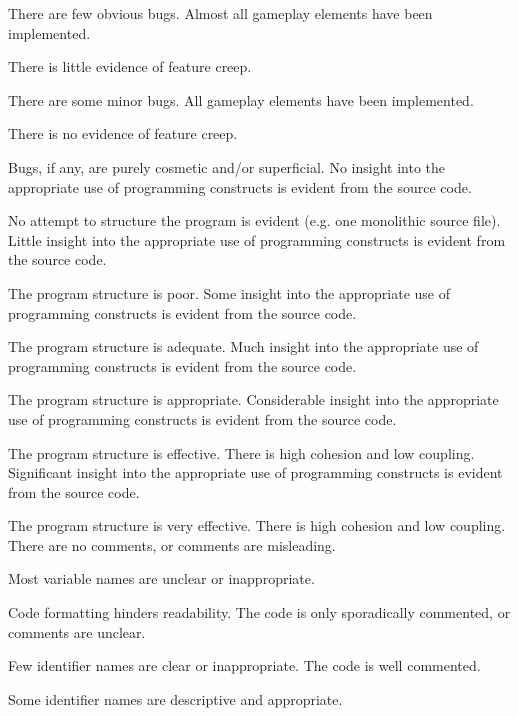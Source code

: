\documentclass{../../fal_assignment}
\begin{document}
\begin{markingrubric}
            \par There are few obvious bugs.
        \grade Almost all gameplay elements have been implemented.
            \par There is little evidence of feature creep.
            \par There are some minor bugs.
        \grade All gameplay elements have been implemented.
            \par There is no evidence of feature creep.
            \par Bugs, if any, are purely cosmetic and/or superficial.
%
        \grade\fail No insight into the appropriate use of programming constructs is evident from the source code.
            \par No attempt to structure the program is evident (e.g. one monolithic source file).
        \grade Little insight into the appropriate use of programming constructs is evident from the source code.
            \par The program structure is poor.
        \grade Some insight into the appropriate use of programming constructs is evident from the source code.
            \par The program structure is adequate.
        \grade Much insight into the appropriate use of programming constructs is evident from the source code.
            \par The program structure is appropriate.
        \grade Considerable insight into the appropriate use of programming constructs is evident from the source code.
            \par The program structure is effective. There is high cohesion and low coupling.
        \grade Significant insight into the appropriate use of programming constructs is evident from the source code.
            \par The program structure is very effective. There is high cohesion and low coupling.
%
        \grade\fail There are no comments, or comments are misleading.
            \par Most variable names are unclear or inappropriate.
            \par Code formatting hinders readability.
        \grade The code is only sporadically commented, or comments are unclear.
            \par Few identifier names are clear or inappropriate.
        \grade The code is well commented.
            \par Some identifier names are descriptive and appropriate.

\end{markingrubric}
\end{document}
